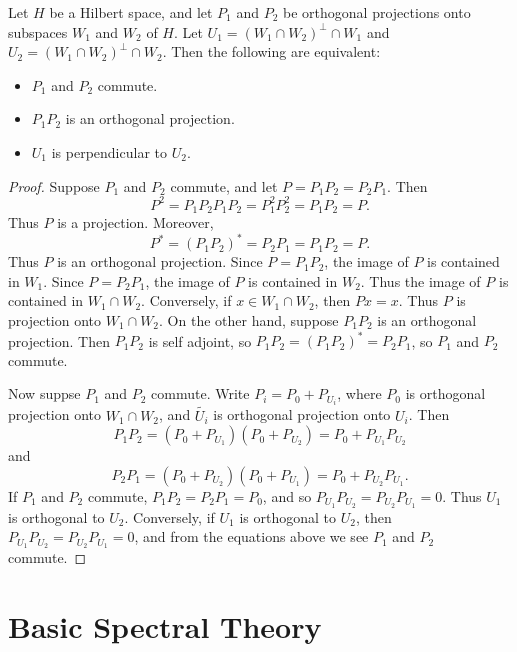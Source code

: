 \begin{theorem}
    Let $H$ be a Hilbert space, and let $P_1$ and $P_2$ be orthogonal projections onto subspaces $W_1$ and $W_2$ of $H$. Let $U_1 = (W_1 \cap W_2)^\perp \cap W_1$ and $U_2 = (W_1 \cap W_2)^\perp \cap W_2$. Then the following are equivalent:
    \begin{itemize}
        \item $P_1$ and $P_2$ commute.
        \item $P_1 P_2$ is an orthogonal projection.
        \item $U_1$ is perpendicular to $U_2$.
    \end{itemize}
\end{theorem}
\begin{proof}
    Suppose $P_1$ and $P_2$ commute, and let $P = P_1 P_2 = P_2 P_1$. Then
    \[ P^2 = P_1 P_2 P_1 P_2 = P_1^2 P_2^2 = P_1 P_2 = P. \]
    Thus $P$ is a projection. Moreover,
    \[ P^* = (P_1 P_2)^* = P_2 P_1 = P_1 P_2 = P. \]
    Thus $P$ is an orthogonal projection. Since $P = P_1 P_2$, the image of $P$ is contained in $W_1$. Since $P = P_2 P_1$, the image of $P$ is contained in $W_2$. Thus the image of $P$ is contained in $W_1 \cap W_2$. Conversely, if $x \in W_1 \cap W_2$, then $Px = x$. Thus $P$ is projection onto $W_1 \cap W_2$. On the other hand, suppose $P_1 P_2$ is an orthogonal projection. Then $P_1 P_2$ is self adjoint, so $P_1 P_2 = (P_1 P_2)^* = P_2 P_1$, so $P_1$ and $P_2$ commute.

    Now suppse $P_1$ and $P_2$ commute. Write $P_i = P_0 + P_{U_i}$, where $P_0$ is orthogonal projection onto $W_1 \cap W_2$, and $\tilde{U_i}$ is orthogonal projection onto $U_i$. Then
    \[ P_1 P_2 = (P_0 + P_{U_1})(P_0 + P_{U_2}) = P_0 + P_{U_1} P_{U_2} \]
    and
    \[ P_2 P_1 = (P_0 + P_{U_2}) (P_0 + P_{U_1}) = P_0 + P_{U_2} P_{U_1}. \]
    If $P_1$ and $P_2$ commute, $P_1 P_2 = P_2 P_1 = P_0$, and so $P_{U_1} P_{U_2} = P_{U_2} P_{U_1} = 0$. Thus $U_1$ is orthogonal to $U_2$. Conversely, if $U_1$ is orthogonal to $U_2$, then $P_{U_1} P_{U_2} = P_{U_2} P_{U_1} = 0$, and from the equations above we see $P_1$ and $P_2$ commute.
\end{proof}






\chapter{Basic Spectral Theory}


